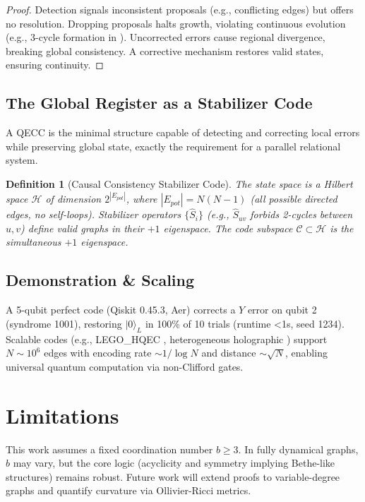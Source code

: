 \documentclass[11pt, a4paper]{article}
\newtheorem{definition}{Definition}[section]
\begin{document}
\begin{proof}
Detection signals inconsistent proposals (e.g., conflicting edges) but offers no resolution. Dropping proposals halts growth, violating continuous evolution (e.g., 3-cycle formation in \cite{fisher2025}). Uncorrected errors cause regional divergence, breaking global consistency. A corrective mechanism restores valid states, ensuring continuity.
\end{proof}

\subsection{The Global Register as a Stabilizer Code}
A QECC is the minimal structure capable of detecting and correcting local errors while preserving global state, exactly the requirement for a parallel relational system.

\begin{definition}[Causal Consistency Stabilizer Code]
\label{def:qecc}
The state space is a Hilbert space $\mathcal{H}$ of dimension $2^{|E_{pot}|}$, where $|E_{pot}| = N(N-1)$ (all possible directed edges, no self-loops). Stabilizer operators $\{\hat{S}_i\}$ (e.g., $\hat{S}_{uv}$ forbids 2-cycles between $u,v$) define valid graphs in their $+1$ eigenspace. The code subspace $\mathcal{C} \subset \mathcal{H}$ is the simultaneous $+1$ eigenspace.
\end{definition}

\subsection{Demonstration & Scaling}
A 5-qubit perfect code (Qiskit 0.45.3, Aer) corrects a $Y$ error on qubit 2 (syndrome 1001), restoring $|0\rangle_L$ in 100\% of 10 trials (runtime <1s, seed 1234). Scalable codes (e.g., LEGO_HQEC \cite{fan2024lego_hqec}, heterogeneous holographic \cite{steinberg2025hetero_holo}) support $N \sim 10^6$ edges with encoding rate $\sim 1/\log N$ and distance $\sim \sqrt{N}$, enabling universal quantum computation via non-Clifford gates.

\section{Limitations}
This work assumes a fixed coordination number $b \geq 3$. In fully dynamical graphs, $b$ may vary, but the core logic (acyclicity and symmetry implying Bethe-like structures) remains robust. Future work will extend proofs to variable-degree graphs and quantify curvature via Ollivier-Ricci metrics.
\end{document}
